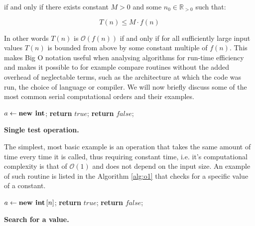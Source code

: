 \documentclass[12pt,twoside]{mitthesis}
\theoremstyle{plain}
\theoremstyle{definition}
\theoremstyle{remark}
\begin{document}
\noindent
if and only if there exists constant $M>0$ and some $n_0 \in \mathbb{R}_{>0}$ such that:

\begin{equation}
T(n)\leq M \cdot f(n)
\end{equation}

\noindent
In other words $T(n)$ is $\mathcal{O}\left(f(n)\right)$ if and only if for all sufficiently large input values $T(n)$ is bounded from above by some constant multiple of $f(n)$.
This makes Big O notation useful when analysing algorithms for run-time efficiency and makes it possible to for example compare routines without the added overhead of neglectable terms, such as the architecture at which the code was run, the choice of language or compiler.
We will now briefly discuss some of the most common serial computational orders and their examples. 

\begin{algorithm}[H]
\begin{center}
\begin{algorithmic}[1]
\footnotesize{
\State $a \gets \text{\textbf{new int}}$;
%
%
\State \textbf{return} $true$;
%
\Else 
%
\State \textbf{return} $false$;
%
\EndIf
}
\end{algorithmic}
\end{center}
\caption{{ \footnotesize {\bf Single test operation.} 
}}
\label{alg:o1}
\end{algorithm}

The simplest, most basic example is an operation that takes the same amount of time every time it is called, thus requiring constant time, i.e. it's computational complexity is that of $\mathcal{O}\left(1\right)$ and does not depend on the input size.
An example of such routine is listed in the Algorithm \ref{alg:o1} that checks for a specific value of a constant.

\begin{algorithm}[H]
\begin{center}
\begin{algorithmic}[1]
\footnotesize{
\State $a \gets \text{\textbf{new int}}\left[n\right]$;
%
%
%
\State \textbf{return} $true$;
%
\Else 
%
\State \textbf{return} $false$;
%
\EndIf
%
\EndFor
}
\end{algorithmic}
\end{center}
\caption{{ \footnotesize {\bf Search for a value.} 
}}
\label{alg:on}
\end{algorithm}
\end{document}
